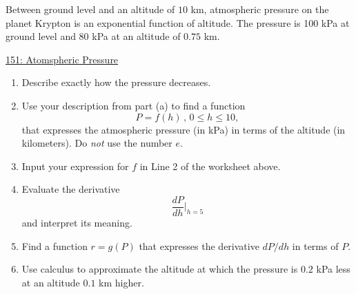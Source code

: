 \documentclass{ximera}
\begin{document}
\begin{question}  \label{Qgfhhfhdffv}
Between ground level and an altitude of $10$ km, atmospheric pressure on the planet Krypton is an exponential function of altitude. The pressure is 100 kPa at ground level and 80 kPa at an altitude of $0.75$ km.

\begin{onlineOnly}
    \begin{center}
\end{center}
\end{onlineOnly}

\href{https://www.desmos.com/calculator/j5h8kaj8xs}{151: Atomspheric Pressure}

\begin{enumerate}
\item Describe exactly how the pressure decreases.

\item Use your description from part (a) to find a function
\[
         P = f(h) \, , \, 0\leq h \leq 10 ,
\]
that expresses the atmospheric pressure (in kPa) in terms of the altitude (in kilometers). Do \emph{not} use the number $e$.

\item Input your expression for $f$ in Line 2 of the worksheet above.

\item Evaluate the derivative 
\[
       \frac{dP}{dh}\Big|_{h=5}
\]
and interpret its meaning.

\item Find a function $r=g(P)$ that expresses the derivative $dP/dh$ in terms of $P$.

\item Use calculus to approximate the altitude at which the pressure is $0.2$ kPa less at an altitude $0.1$ km higher.

\end{enumerate}
  
\end{question}
\end{document}
